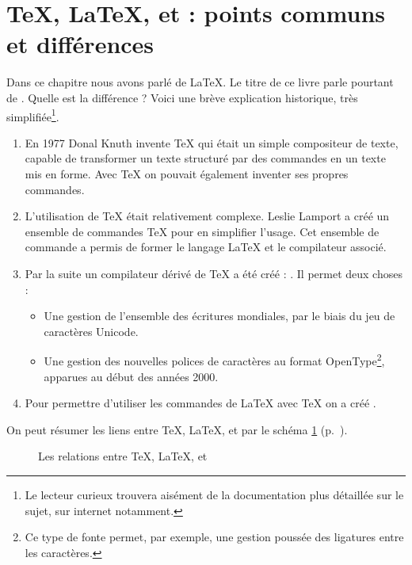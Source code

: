 \section[TeX, LaTeX, XeTeX, XeLaTeX : points communs et différences]{\TeX{}, \LaTeX{}, \XeTeX{} et \XeLaTeX{} : points communs et différences}\label{TeXLaTeX}

Dans ce chapitre nous avons parlé de \LaTeX{}. Le titre de ce livre parle pourtant  de \XeLaTeX{}. Quelle est la différence ? Voici une brève explication historique, très simplifiée\footnote{Le lecteur curieux trouvera aisément de la documentation plus détaillée sur le sujet, sur internet notamment.}.

\begin{enumerate}
\item En 1977 Donal Knuth invente  \TeX{} qui était un simple compositeur de texte, capable de transformer un texte structuré par des commandes en un texte mis en forme. Avec \TeX{} on pouvait également inventer ses propres commandes.
\item L'utilisation de \TeX{} était relativement complexe. Leslie Lamport a créé un ensemble de commandes \TeX{} pour en simplifier l'usage. Cet ensemble de commande a permis de former le langage \LaTeX{} et le compilateur associé.
\item Par la suite un compilateur dérivé de \TeX{} a été créé : \XeTeX{}. Il permet deux choses :
\begin{itemize}
	\item Une gestion  de l'ensemble des écritures mondiales, par le biais du jeu de caractères Unicode.
	\item Une gestion des nouvelles polices de caractères au format OpenType\footnote{Ce type de fonte permet, par exemple, une gestion poussée des ligatures entre les caractères.}, apparues au début des années 2000.

\end{itemize} 
\item Pour permettre d'utiliser les commandes de \LaTeX{} avec \TeX{} on a créé \XeLaTeX{}.
\end{enumerate}

On peut résumer les liens entre \TeX{}, \LaTeX{}, \XeTeX{} et \XeLaTeX{} par le schéma \ref{sch:tex} (p.~\pageref{sch:tex}).

\begin{figure}[ht]
\centering

\caption{Les relations entre \TeX{}, \LaTeX{}, \XeTeX{} et \XeLaTeX{}}\label{sch:tex}
\end{figure} 

